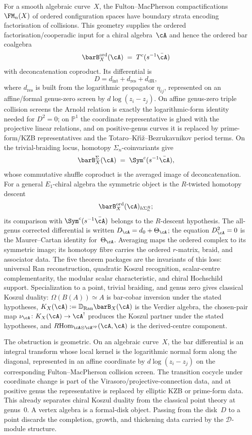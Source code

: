For a smooth algebraic curve~$X$, the Fulton--MacPherson
compactifications $\FM_n(X)$ of ordered configuration spaces have
boundary strata encoding factorisation of collisions. This geometry
supplies the ordered factorisation/cooperadic input for a chiral
algebra~$\cA$ and hence the ordered bar coalgebra
\[
\barB^{\mathrm{ord}}_X(\cA)\;=\;T^c(s^{-1}\bar\cA)
\]
with deconcatenation coproduct. Its differential is
\[
D=d_{\mathrm{int}}+d_{\mathrm{res}}+d_{\mathrm{dR}},
\]
where $d_{\mathrm{res}}$ is built from the logarithmic propagator
$\eta_{ij}$, represented on an affine/formal genus-zero screen by
\(d\log(z_i-z_j)\). On affine genus-zero triple collision screens the
Arnold relation is exactly the logarithmic-form identity needed for
$D^2=0$; on $\mathbb P^1$ the coordinate representative is glued with
the projective linear relations, and on positive-genus curves it is
replaced by prime-form/KZB representatives and the
Totaro--K\v{r}\'{\i}\v{z}--Bezrukavnikov period terms.  On the
trivial-braiding locus, homotopy \(\Sigma_n\)-coinvariants give
\[
\barB^{\Sigma}_X(\cA)\;=\;\Sym^c(s^{-1}\bar\cA),
\]
whose commutative shuffle coproduct is the averaged image of
deconcatenation.  For a general \(E_1\)-chiral algebra the symmetric
object is the \(R\)-twisted homotopy descent
\[
\barB_X^{\mathrm{ord}}(\cA)_{h\Sigma_n^R};
\]
its comparison with \(\Sym^c(s^{-1}\bar\cA)\) belongs to the
\(R\)-descent hypothesis.  The all-genus corrected differential is written
$D_\cA=d_0+\Theta_\cA$; the equation $D_\cA^2=0$ is the
Maurer--Cartan identity for~$\Theta_\cA$.  Averaging maps the ordered
complex to its symmetric image; its homotopy fibre carries the
ordered \(r\)-matrix, braid, and associator data.
The five theorem packages are the invariants of this loss: universal
Ran reconstruction, quadratic Koszul recognition, scalar-centre
complementarity, the modular scalar characteristic, and chiral
Hochschild support.  Specialization to a point,
trivial braiding, and genus zero gives classical Koszul duality:
$\Omega(B(A))\simeq A$ is
bar-cobar inversion under the stated hypotheses,
$K_X(\cA):=\mathbb{D}_{\operatorname{Ran}}\barB_X(\cA)$ is the
Verdier algebra, the chosen-pair map
$\nu_\cA\colon K_X(\cA)\to\cA^!$ produces the Koszul partner under
the stated hypotheses, and
$R\!\operatorname{Hom}_{\cA\otimes\cA^{\mathrm{op}}}(\cA,\cA)$ is
the derived-centre component.

The obstruction is geometric. On an algebraic curve~$X$, the bar
differential is an integral transform whose local kernel is the
logarithmic normal form along the diagonal, represented in an affine
coordinate by $d\log(z_i - z_j)$ on the corresponding
Fulton--MacPherson collision screen. The transition cocycle under
coordinate change is part of the Virasoro/projective-connection data,
and at positive genus the representative is replaced by elliptic KZB
or prime-form data. This already separates chiral Koszul duality from
the classical point theory at genus~$0$. A vertex algebra is a
formal-disk object. Passing from the disk~$D$ to a point discards the
completion, growth, and thickening data carried by the
$\mathcal{D}$-module structure.

